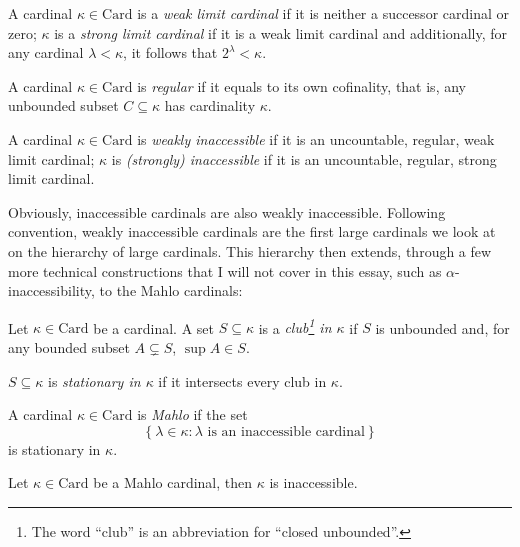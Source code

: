 \documentclass[12pt]{article}
\theoremstyle{plain}
\theoremstyle{definition}
\newcommand{\Card}{\mathrm{Card}}
\begin{document}
\begin{definition}
	A cardinal $\kappa \in \Card$ is a \emph{weak limit cardinal} if it is neither a successor cardinal or zero; $\kappa$ is a \emph{strong limit cardinal} if it is a weak limit cardinal and additionally, for any cardinal $\lambda < \kappa$, it follows that $2^\lambda < \kappa$.
\end{definition}

\begin{definition}
	A cardinal $\kappa \in \Card$ is \emph{regular} if it equals to its own cofinality, that is, any unbounded subset $C \subseteq \kappa$ has cardinality $\kappa$.
\end{definition}

\begin{definition}
	A cardinal $\kappa \in \Card$ is \emph{weakly inaccessible} if it is an uncountable, regular, weak limit cardinal; $\kappa$ is \emph{(strongly) inaccessible} if it is an uncountable, regular, strong limit cardinal.
\end{definition}

Obviously, inaccessible cardinals are also weakly inaccessible. Following convention, weakly inaccessible cardinals are the first large cardinals we look at on the hierarchy of large cardinals. This hierarchy then extends, through a few more technical constructions that I will not cover in this essay, such as $\alpha$-inaccessibility, to the Mahlo cardinals:

\begin{definition}
	Let $\kappa \in \Card$ be a cardinal. A set $S \subseteq \kappa$ is a \emph{club\footnote{The word ``club'' is an abbreviation for ``closed unbounded''.} in $\kappa$} if $S$ is unbounded and, for any bounded subset $A \subsetneq S$, $\sup A \in S$.

	$S \subseteq \kappa$ is \emph{stationary in $\kappa$} if it intersects every club in $\kappa$.
\end{definition}

\begin{definition}
	A cardinal $\kappa \in \Card$ is \emph{Mahlo} if the set
	\[\left\{\lambda \in \kappa : \text{$\lambda$ is an inaccessible cardinal}\right\}\]
	is stationary in $\kappa$.
\end{definition}

\begin{proposition}
	Let $\kappa \in \Card$ be a Mahlo cardinal, then $\kappa$ is inaccessible.
\end{proposition}
\end{document}
